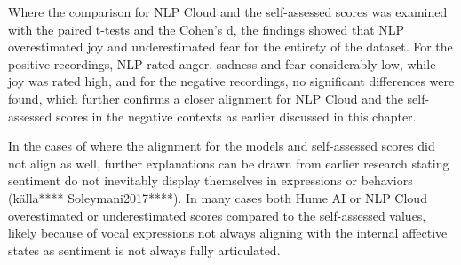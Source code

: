 Where the comparison for NLP Cloud and the self-assessed scores was examined with the paired t-tests and the Cohen’s d, the findings showed that NLP overestimated joy and underestimated fear for the entirety of the dataset.
For the positive recordings, NLP rated anger, sadness and fear considerably low, while joy was rated high, and for the negative recordings, no significant differences were found, which further confirms a closer alignment for NLP Cloud and the self-assessed scores in the negative contexts as earlier discussed in this chapter.

In the cases of where the alignment for the models and self-assessed scores did not align as well, further explanations can be drawn from earlier research stating sentiment do not inevitably display themselves in expressions or behaviors (källa**** Soleymani2017****). In many cases both Hume AI or NLP Cloud overestimated or underestimated scores compared to the self-assessed values, likely because of vocal expressions not always aligning with the internal affective states as sentiment is not always fully articulated. 
